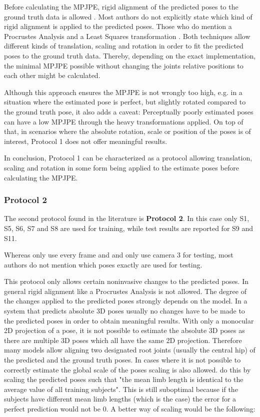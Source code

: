 Before calculating the MPJPE, rigid alignment of the predicted poses to the ground truth data is allowed  \cite{drover18, yasin16, kostrikov14, sun17, tome17, chen17}.
Most authors do not explicitly state which kind of rigid alignment is applied to the predicted poses.
Those who do mention a Procrustes Analysis \cite{sun17, tome17} and a Least Squares transformation \cite{kostrikov14}.
Both techniques allow different kinds of translation, scaling and rotation in order to fit the predicted poses to the ground truth data.
Thereby, depending on the exact implementation, the minimal MPJPE possible without changing the joints relative positions to each other might be calculated.

Although this approach ensures the MPJPE is not wrongly too high, e.g. in a situation where the estimated pose is perfect, but slightly rotated compared to the ground truth pose, it also adds a caveat:
Perceptually poorly estimated poses can have a low MPJPE through the heavy transformations applied.
On top of that, in scenarios where the absolute rotation, scale or position of the poses is of interest, Protocol 1 does not offer meaningful results.

In conclusion, Protocol 1 can be characterized as a protocol allowing translation, scaling and rotation in some form being applied to the estimate poses before calculating the MPJPE.

\subsubsection{Protocol 2}\label{sec:protocol2}

The second protocol found in the literature is \textbf{Protocol 2}.
In this case only S1, S5, S6, S7 and S8 are used for training, while test results are reported for S9 and S11.

Whereas \citet{sun17} only use every  frame and \citet{moreno-noguer16} and \citet{bogo16} only use camera 3 for testing, most authors do not mention which poses exactly are used for testing.

This protocol only allows certain noninvasive changes to the predicted poses.
In general rigid alignment like a Procrustes Analysis is not allowed.
The degree of the changes applied to the predicted poses strongly depends on the model.
In a system that predicts absolute 3D poses usually no changes have to be made to the predicted poses in order to obtain meaningful results.
With only a monocular 2D projection of a pose, it is not possible to estimate the absolute 3D poses as there are multiple 3D poses which all have the same 2D projection.
Therefore many models \cite{martinez17, zhou18, zhou16, tekin16, pavlakos17} allow aligning two designated root joints (usually the central hip) of the predicted and the ground truth poses.
In cases where it is not possible to correctly estimate the global scale of the poses scaling is also allowed.
\citet{zhou18} do this by scaling the predicted poses such that "the mean limb length is identical to the average value of all training subjects".
This is still suboptimal because if the subjects have different mean limb lengths (which is the case) the error for a perfect prediction would not be 0.
A better way of scaling would be the following:

